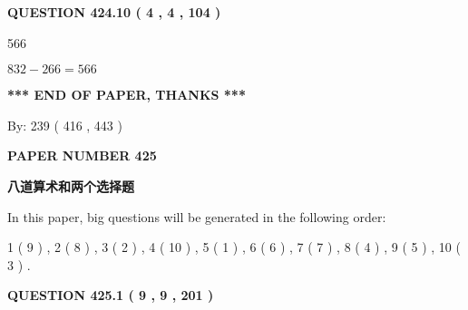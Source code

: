 \documentclass{ctexart}
\begin{document}
 
  
\vspace{0.2in}
  
{\textbf{\Large{QUESTION
424.10 
 ( 4 , 4 , 104 )
}}}
  
  
 
 
\noindent{}

566
 
 
 
 
\noindent{}

$ %
832 -  %
266=   %
566$
 
 
   
   
 \vspace{0.2in}
 
   
   
   
   
\vspace{1.0in} 
{\textbf{\large{ *** END OF PAPER, THANKS *** }}} 
   
   
\hspace{1.0in} By: 
 239 ( 416 ,  443 )
   
   
   
   
\newpage 
\setcounter{page}{ 
   425001 } 
   
   
   
   
 {\textbf{ \Large{ PAPER NUMBER  425  }}}
   
   
\vspace{0.2in}
   
   
   
   
   
   
 \vspace{0.2in}
{\LARGE {\textbf{ 八道算术和两个选择题}}}
   
   
   
\vspace{0.2in}
   
In this paper, big questions will be generated in the following order: 
   
   
   1 ( 9 )
 ,
   2 ( 8 )
 ,
   3 ( 2 )
 ,
   4 ( 10 )
 ,
   5 ( 1 )
 ,
   6 ( 6 )
 ,
   7 ( 7 )
 ,
   8 ( 4 )
 ,
   9 ( 5 )
 ,
   10 ( 3 )
 .
  
\vspace{0.2in}
  
{\textbf{\Large{QUESTION
425.1 
 ( 9 , 9 , 201 )
}}}
  
\end{document}
